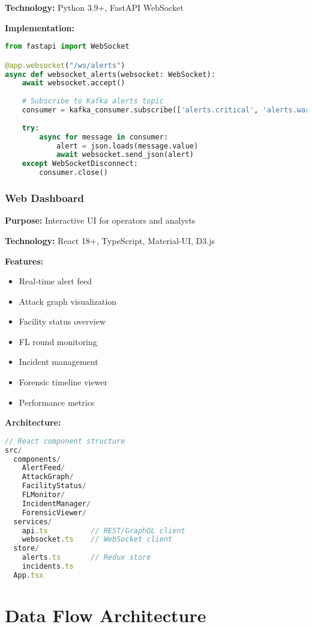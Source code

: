 \documentclass[12pt,a4paper]{article}
\begin{document}
\textbf{Technology:} Python 3.9+, FastAPI WebSocket

\textbf{Implementation:}
\begin{lstlisting}[language=python]
from fastapi import WebSocket

@app.websocket("/ws/alerts")
async def websocket_alerts(websocket: WebSocket):
    await websocket.accept()
    
    # Subscribe to Kafka alerts topic
    consumer = kafka_consumer.subscribe(['alerts.critical', 'alerts.warning'])
    
    try:
        async for message in consumer:
            alert = json.loads(message.value)
            await websocket.send_json(alert)
    except WebSocketDisconnect:
        consumer.close()
\end{lstlisting}

\subsubsection{Web Dashboard}

\textbf{Purpose:} Interactive UI for operators and analysts

\textbf{Technology:} React 18+, TypeScript, Material-UI, D3.js

\textbf{Features:}
\begin{itemize}[leftmargin=1cm,itemsep=0pt]
    \item Real-time alert feed
    \item Attack graph visualization
    \item Facility status overview
    \item FL round monitoring
    \item Incident management
    \item Forensic timeline viewer
    \item Performance metrics
\end{itemize}

\textbf{Architecture:}
\begin{lstlisting}[language=typescript]
// React component structure
src/
  components/
    AlertFeed/
    AttackGraph/
    FacilityStatus/
    FLMonitor/
    IncidentManager/
    ForensicViewer/
  services/
    api.ts          // REST/GraphQL client
    websocket.ts    // WebSocket client
  store/
    alerts.ts       // Redux store
    incidents.ts
  App.tsx
\end{lstlisting}

\section{Data Flow Architecture}
\end{document}

